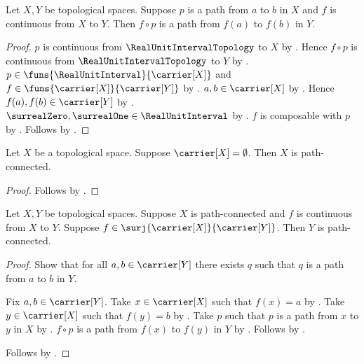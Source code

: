 \begin{theorem}\label{continuous_image_of_path}
    Let $X,Y$ be topological spaces.
    Suppose $p$ is a path from $a$ to $b$ in $X$ and
        $f$ is continuous from $X$ to $Y$.
    Then $f\circ p$ is a path from $f(a)$ to $f(b)$ in $Y$.
\end{theorem}
\begin{proof}
    $p$ is continuous from $\RealUnitIntervalTopology$ to $X$ by .
    Hence $f\circ p$ is continuous from $\RealUnitIntervalTopology$ to $Y$ by
        .
    $p\in\funs{\RealUnitInterval}{\carrier[X]}$ and
        $f\in\funs{\carrier[X]}{\carrier[Y]}$ by
        .
    $a,b\in\carrier[X]$ by .
    Hence $f(a),f(b)\in\carrier[Y]$ by .
    $\surrealZero,\surrealOne\in\RealUnitInterval$ by
        .
    $f$ is composable with $p$ by .
    Follows by .
\end{proof}

\begin{theorem}\label{empty_space_is_path_connected}
    Let $X$ be a topological space.
    Suppose $\carrier[X]=\emptyset$.
    Then $X$ is path-connected.
\end{theorem}
\begin{proof}
    Follows by .
\end{proof}

\begin{theorem}\label{continuous_surjective_image_is_path_connected}
    Let $X,Y$ be topological spaces.
    Suppose $X$ is path-connected and $f$ is continuous from $X$ to $Y$.
    Suppose $f\in\surj{\carrier[X]}{\carrier[Y]}$.
    Then $Y$ is path-connected.
\end{theorem}
\begin{proof}
    Show that for all $a,b\in\carrier[Y]$ there exists $q$ such that
        $q$ is a path from $a$ to $b$ in $Y$.
    \begin{subproof}
        Fix $a,b\in\carrier[Y]$.
        Take $x\in\carrier[X]$ such that $f(x)=a$ by .
        Take $y\in\carrier[X]$ such that $f(y)=b$ by .
        Take $p$ such that $p$ is a path from $x$ to $y$ in $X$ by .
        $f\circ p$ is a path from $f(x)$ to $f(y)$ in $Y$ by .
        Follows by .
    \end{subproof}
    Follows by .
\end{proof}

